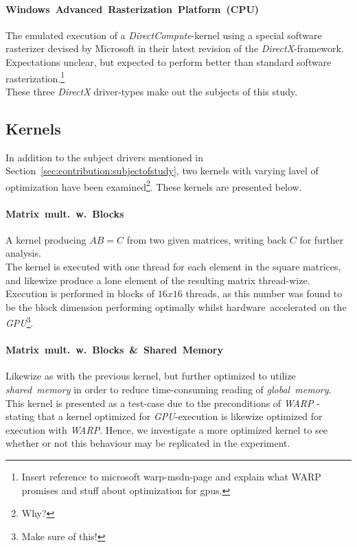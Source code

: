 \documentclass[fleqn,10pt]{SelfArx} %
\begin{document}
\paragraph{Windows~Advanced~Rasterization~Platform~(CPU)}
	The emulated execution of a \textit{DirectCompute}-kernel using a special software rasterizer devised by Microsoft in their latest revision of the \textit{DirectX}-framework.\\	
	Expectations unclear, but expected to perform better than standard software rasterization.\footnote{Insert reference to microsoft warp-msdn-page and explain what WARP promises and stuff about optimization for gpus.}\\

\noindent
These three \textit{DirectX} driver-types make out the subjects of this study.

\subsection{Kernels}
\label{sec:contribution:kernels}
In addition to the subject drivers mentioned in Section~\ref{sec:contribution:subjectofstudy}, two kernels with varying lavel of optimization have been examined\footnote{Why?}. These kernels are presented below.
\paragraph{Matrix~mult.~w.~Blocks}
	A kernel producing $AB=C$ from two given matrices, writing back $C$ for further analysis.\\
	The kernel is executed with one thread for each element in the square matrices, and likewize produce a lone element of the resulting matrix thread-wize.\\
	Execution is performed in blocks of $16x16$ threads, as this number was found to be the block dimension performing optimally whilst hardware~accelerated on the \textit{GPU}\footnote{Make sure of this!}. 
\paragraph{Matrix~mult.~w.~Blocks~\&~Shared~Memory}
	Likewize as with the previous kernel, but further optimized to utilize \textit{shared~memory} in order to reduce time-consuming reading of \textit{global~memory}\cite[p.~77-93]{Kirk:2010:PMP:1841511}.\\
	This kernel is presented as a test-case due to the preconditions of \textit{WARP} - stating that a kernel optimized for \textit{GPU}-execution is likewize optimized for execution with \textit{WARP}. Hence, we investigate a more optimized kernel to see whether or not this behaviour may be replicated in the experiment.\\
\end{document}
